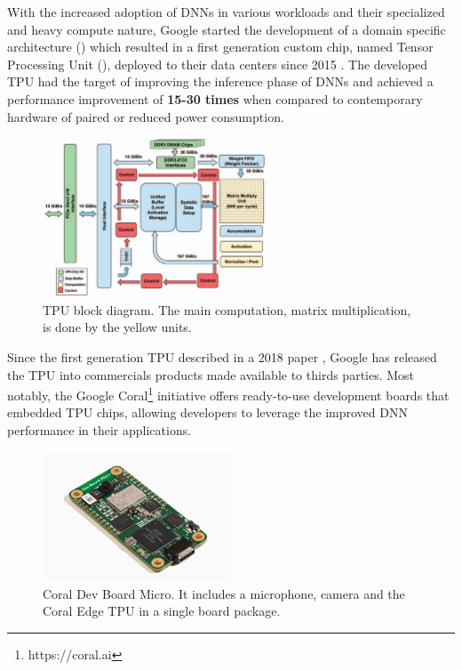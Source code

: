 \documentclass[openright]{normas-utf-tex} %
\begin{document}
With the increased adoption of DNNs in various workloads and their specialized
and heavy compute nature, Google started the development of a domain specific
architecture () which resulted in a
first generation custom chip, named Tensor Processing Unit (), deployed to their data centers since 2015 \cite{Google2015}.
The developed TPU had the target of improving the inference phase of DNNs and
achieved a performance improvement of \textbf{15-30 times} when compared to
contemporary hardware of paired or reduced power consumption.

\begin{figure}[H]
	\centering
	\includegraphics[width=0.6\textwidth]{./images/tpublock.png}
	\caption[TPU block diagram]{TPU block diagram. The main computation, matrix multiplication, is done by the yellow units.}
	\label{fig:gauge1}
\end{figure}

Since the first generation TPU described in a 2018 paper \cite{Google2015},
Google has released the TPU into commercials products made available to thirds
parties. Most notably, the Google Coral\footnote{https://coral.ai} initiative
offers ready-to-use development boards that embedded TPU chips, allowing
developers to leverage the improved DNN performance in their applications.

\begin{figure}[H]
	\centering
	\includegraphics[width=0.5\textwidth]{./images/coralboard.png}
	\caption[Coral Dev Board Micro]{Coral Dev Board Micro. It includes a microphone, camera and the Coral Edge TPU in a single board package.}
\end{figure}
\end{document}
